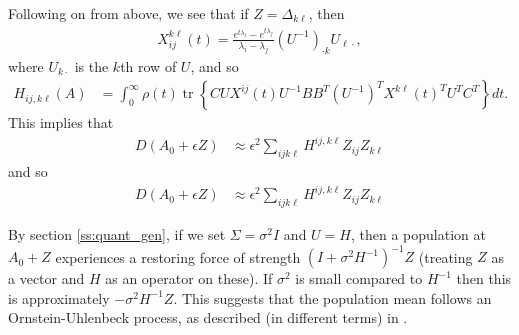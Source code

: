 \documentclass{article}
\newcommand{\tr}{\mathop{\mbox{tr}}} %
\newcommand{\1}{\mathbbm{1}}
\begin{document}
Following on from above, we see that if $Z=\Delta_{k \ell}$, then
\begin{equation}
  \begin{aligned}
      X_{ij}^{k\ell}(t) = 
      \frac{ e^{t \lambda_i} - e^{t \lambda_j} }{ \lambda_i - \lambda_j } 
      (U^{-1})_{\cdot k} U_{\ell \cdot},
  \end{aligned}
\end{equation}
where $U_{k \cdot}$ is the $k$th row of $U$,
and so
\begin{equation}
    \begin{aligned}
        H_{ij, k\ell}(A)
        &=
        \int_0^\infty
            \rho(t) \tr\left\{ C U X^{ij}(t) U^{-1} B B^T (U^{-1})^T X^{k\ell}(t)^T U^T C^T \right\}
        dt .
    \end{aligned}
\end{equation}
This implies that
\begin{equation}
    \begin{aligned}
        D(A_0+\epsilon Z)
        &\approx \epsilon^2\sum_{ijk\ell} H^{ij,k\ell} Z_{ij} Z_{k\ell} 
    \end{aligned}
\end{equation}
and so
\begin{equation}
    \begin{aligned}
        D(A_0+\epsilon Z)
        &\approx \epsilon^2\sum_{ijk\ell} H^{ij,k\ell} Z_{ij} Z_{k\ell} 
    \end{aligned}
\end{equation}

By section \ref{ss:quant_gen},
if we set $\Sigma=\sigma^2 I$ and $U=H$,
then a population at $A_0+Z$ experiences a restoring force of strength
$(I + \sigma^2 H^{-1})^{-1} Z$ (treating $Z$ as a vector and $H$ as an operator on these).
If $\sigma^2$ is small compared to $H^{-1}$
then this is approximately $-\sigma^2 H^{-1} Z$.
This suggests that the population mean follows an Ornstein-Uhlenbeck process,
as described (in different terms) in \citet{hansen1996translating}.
\end{document}
